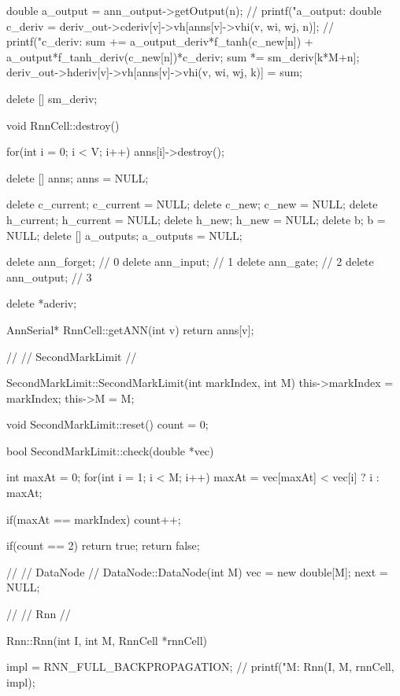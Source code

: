 {{{{{{                double a\_output = ann\_output->getOutput(n);
                // printf("a\_output:%
                double c\_deriv = deriv\_out->cderiv[v]->vh[anns[v]->vhi(v, wi, wj, n)];
                // printf("c\_deriv:%
                sum += a\_output\_deriv*f\_tanh(c\_new[n]) + a\_output*f\_tanh\_deriv(c\_new[n])*c\_deriv;
                sum *= sm\_deriv[k*M+n];
              }
              deriv\_out->hderiv[v]->vh[anns[v]->vhi(v, wi, wj, k)] = sum;

            }
          }
        }
      }

  delete [] sm\_deriv;

}

void RnnCell::destroy(){
    for(int i = 0; i < V; i++){
      anns[i]->destroy();
    }

   delete [] anns;
   anns = NULL;


  delete c\_current;
  c\_current = NULL;
  delete c\_new;
  c\_new = NULL;
  delete h\_current;
  h\_current = NULL;
  delete h\_new;
  h\_new = NULL;
  delete b;
  b = NULL;
  delete [] a\_outputs;
  a\_outputs = NULL;

  delete ann\_forget; // 0
  delete ann\_input; // 1
  delete ann\_gate; // 2
  delete ann\_output; // 3

  delete *aderiv;

}


AnnSerial* RnnCell::getANN(int v){
  return anns[v];
}


//
// SecondMarkLimit
//

SecondMarkLimit::SecondMarkLimit(int markIndex, int M){
  this->markIndex = markIndex;
  this->M = M;
}

void SecondMarkLimit::reset(){
  count = 0;
}

bool SecondMarkLimit::check(double *vec){
  int maxAt = 0;
  for(int i = 1; i < M; i++)
    maxAt = vec[maxAt] < vec[i] ? i : maxAt;

  if(maxAt == markIndex) count++;

  if(count == 2) return true;
  return false;
}


//
// DataNode
//
DataNode::DataNode(int M){
  vec = new double[M];
  next = NULL;
}

//
// Rnn
//

Rnn::Rnn(int I, int M, RnnCell *rnnCell){

  impl = RNN\_FULL\_BACKPROPAGATION;
  // printf("M:%
  Rnn(I, M, rnnCell, impl);
}

